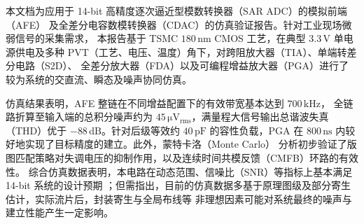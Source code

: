 	
\begin{chineseabstract}
本文档为应用于 14-bit 高精度逐次逼近型模数转换器（SAR ADC）的模拟前端（AFE）
及全差分电容数模转换器（CDAC）的仿真验证报告。针对工业现场微弱信号的采集需求，
本报告基于 TSMC $180\,\mathrm{nm}$ CMOS 工艺，在典型 $3.3\,\mathrm{V}$ 单电源供电及多种 
PVT（工艺、电压、温度）角下，对跨阻放大器（TIA）、单端转差分电路（S2D）、
全差分放大器（FDA）以及可编程增益放大器（PGA）进行了较为系统的交直流、瞬态及噪声协同仿真。

仿真结果表明，AFE 整链在不同增益配置下的有效带宽基本达到 $700\,\mathrm{kHz}$，
全链路折算至输入端的总积分噪声约为 $45\,\mathrm{\mu V_{rms}}$，满量程大信号输出总谐波失真
（THD）优于 $-88\,\mathrm{dB}$。针对后级等效约 $40\,\mathrm{pF}$ 的容性负载，PGA 
在 $800\,\mathrm{ns}$ 内较好地实现了目标精度的建立。此外，蒙特卡洛（Monte Carlo）
分析初步验证了版图匹配策略对失调电压的抑制作用，以及连续时间共模反馈（CMFB）环路的有效性。
综合仿真数据表明，本电路在动态范围、信噪比（SNR）等指标上基本满足 14-bit 系统的设计预期
；但需指出，目前的仿真数据多基于原理图级及部分寄生估计，实际流片后，封装寄生与全局布线等
非理想因素可能对系统最终的噪声与建立性能产生一定影响。



\end{chineseabstract}

